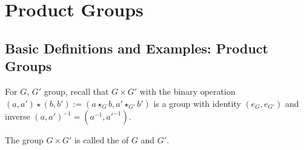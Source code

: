 \documentclass[12pt, a4paper, oneside, openright, titlepage]{book}
\begin{document}
\chapter{\textsection\textsection Product Groups}


\section{\textsection Basic Definitions and Examples: Product Groups}

\begin{rec}
        For $G$, $G'$ group, recall that $G \times G'$ with the binary operation $(a,a') \star (b,b') := (a\star_G b, a' \star_{G'} b')$ is a group with identity $(e_G, e_{G'})$ and inverse $(a,a')^{-1} = (a^{-1},{a'}^{-1})$.
\end{rec}


\begin{defn}
        The group $G \times G'$ is called the  of $G$ and $G'$.
\end{defn}
\end{document}
